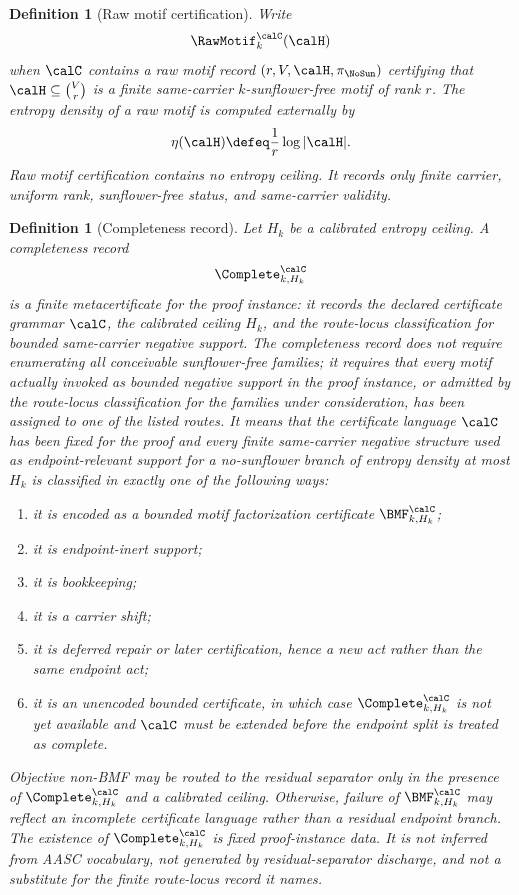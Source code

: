 \documentclass[11pt]{article}
\newtheorem{definition}[theorem]{Definition}
\begin{document}
\begin{definition}[Raw motif certification]
Write
\[
  \RawMotif^{\calC}_{k}(\calH)
\]
when \(\calC\) contains a raw motif record \((r,V,\calH,\pi_{\NoSun})\) certifying that \(\calH\subseteq\binom Vr\) is a finite same-carrier \(k\)-sunflower-free motif of rank \(r\).  The entropy density of a raw motif is computed externally by
\[
  \eta(\calH)\defeq \frac1r\log|\calH|.
\]
Raw motif certification contains no entropy ceiling.  It records only finite carrier, uniform rank, sunflower-free status, and same-carrier validity.
\end{definition}

\begin{definition}[Completeness record]
Let \(H_k\) be a calibrated entropy ceiling.  A completeness record
\[
  \Complete^{\calC}_{k,H_k}
\]
is a finite metacertificate for the proof instance: it records the declared certificate grammar \(\calC\), the calibrated ceiling \(H_k\), and the route-locus classification for bounded same-carrier negative support.  The completeness record does not require enumerating all conceivable sunflower-free families; it requires that every motif actually invoked as bounded negative support in the proof instance, or admitted by the route-locus classification for the families under consideration, has been assigned to one of the listed routes.  It means that the certificate language \(\calC\) has been fixed for the proof and every finite same-carrier negative structure used as endpoint-relevant support for a no-sunflower branch of entropy density at most \(H_k\) is classified in exactly one of the following ways:
\begin{enumerate}[label=(\roman*)]
\item it is encoded as a bounded motif factorization certificate \(\BMF^{\calC}_{k,H_k}\);
\item it is endpoint-inert support;
\item it is bookkeeping;
\item it is a carrier shift;
\item it is deferred repair or later certification, hence a new act rather than the same endpoint act;
\item it is an unencoded bounded certificate, in which case \(\Complete^{\calC}_{k,H_k}\) is not yet available and \(\calC\) must be extended before the endpoint split is treated as complete.
\end{enumerate}
Objective non-BMF may be routed to the residual separator only in the presence of \(\Complete^{\calC}_{k,H_k}\) and a calibrated ceiling.  Otherwise, failure of \(\BMF^{\calC}_{k,H_k}\) may reflect an incomplete certificate language rather than a residual endpoint branch.
The existence of \(\Complete^{\calC}_{k,H_k}\) is fixed proof-instance data.  It is not inferred from AASC vocabulary, not generated by residual-separator discharge, and not a substitute for the finite route-locus record it names.
\end{definition}
\end{document}

